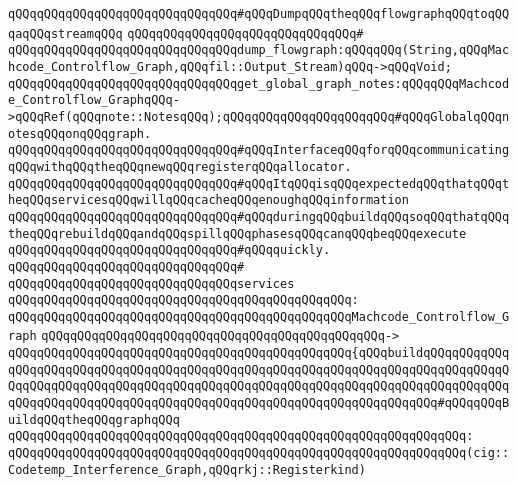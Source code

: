 \newline
\verb|qQQqqQQqqQQqqQQqqQQqqQQqqQQqqQQq#qQQqDumpqQQqtheqQQqflowgraphqQQqtoqQQqaqQQqstreamqQQq|\newline
\verb|qQQqqQQqqQQqqQQqqQQqqQQqqQQqqQQq#|\newline
\verb|qQQqqQQqqQQqqQQqqQQqqQQqqQQqqQQqdump_flowgraph:qQQqqQQq(String,qQQqMachcode_Controlflow_Graph,qQQqfil::Output_Stream)qQQq->qQQqVoid;|\newline
\newline
\verb|qQQqqQQqqQQqqQQqqQQqqQQqqQQqqQQqget_global_graph_notes:qQQqqQQqMachcode_Controlflow_GraphqQQq->qQQqRef(qQQqnote::NotesqQQq);qQQqqQQqqQQqqQQqqQQqqQQq#qQQqGlobalqQQqnotesqQQqonqQQqgraph.|\newline
\newline
\newline
\verb|qQQqqQQqqQQqqQQqqQQqqQQqqQQqqQQq#qQQqInterfaceqQQqforqQQqcommunicatingqQQqwithqQQqtheqQQqnewqQQqregisterqQQqallocator.|\newline
\verb|qQQqqQQqqQQqqQQqqQQqqQQqqQQqqQQq#qQQqItqQQqisqQQqexpectedqQQqthatqQQqtheqQQqservicesqQQqwillqQQqcacheqQQqenoughqQQqinformation|\newline
\verb|qQQqqQQqqQQqqQQqqQQqqQQqqQQqqQQq#qQQqduringqQQqbuildqQQqsoqQQqthatqQQqtheqQQqrebuildqQQqandqQQqspillqQQqphasesqQQqcanqQQqbeqQQqexecute|\newline
\verb|qQQqqQQqqQQqqQQqqQQqqQQqqQQqqQQq#qQQqquickly.|\newline
\verb|qQQqqQQqqQQqqQQqqQQqqQQqqQQqqQQq#|\newline
\verb|qQQqqQQqqQQqqQQqqQQqqQQqqQQqqQQqservices|\newline
\verb|qQQqqQQqqQQqqQQqqQQqqQQqqQQqqQQqqQQqqQQqqQQqqQQq:|\newline
\verb|qQQqqQQqqQQqqQQqqQQqqQQqqQQqqQQqqQQqqQQqqQQqqQQqMachcode_Controlflow_Graph|\newline
\verb|qQQqqQQqqQQqqQQqqQQqqQQqqQQqqQQqqQQqqQQqqQQqqQQq->|\newline
\verb|qQQqqQQqqQQqqQQqqQQqqQQqqQQqqQQqqQQqqQQqqQQqqQQq{qQQqbuildqQQqqQQqqQQqqQQqqQQqqQQqqQQqqQQqqQQqqQQqqQQqqQQqqQQqqQQqqQQqqQQqqQQqqQQqqQQqqQQqqQQqqQQqqQQqqQQqqQQqqQQqqQQqqQQqqQQqqQQqqQQqqQQqqQQqqQQqqQQqqQQqqQQqqQQqqQQqqQQqqQQqqQQqqQQqqQQqqQQqqQQqqQQqqQQqqQQqqQQqqQQqqQQqqQQq#qQQqqQQqBuildqQQqtheqQQqgraphqQQq|\newline
\verb|qQQqqQQqqQQqqQQqqQQqqQQqqQQqqQQqqQQqqQQqqQQqqQQqqQQqqQQqqQQqqQQq:|\newline
\verb|qQQqqQQqqQQqqQQqqQQqqQQqqQQqqQQqqQQqqQQqqQQqqQQqqQQqqQQqqQQqqQQq(cig::Codetemp_Interference_Graph,qQQqrkj::Registerkind)|\newline
